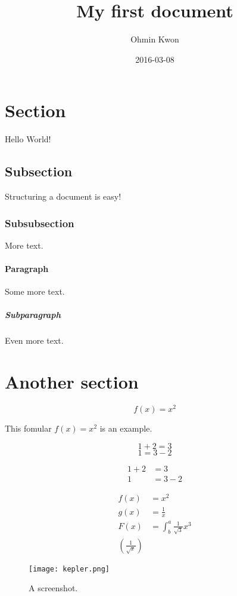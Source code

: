 \documentclass{article}
\title{My first document}
\date{2016-03-08}
\author{Ohmin Kwon}
\begin{document}
\maketitle
\tableofcontents
\newpage
{}

\section{Section}
Hello World!
\subsection{Subsection}
Structuring a document is easy!
\subsubsection{Subsubsection}
More text.
\paragraph{Paragraph}
Some more text.
\subparagraph{Subparagraph}
Even more text.
\section{Another section}

\begin{equation*}
f(x)=x^2
\end{equation*}

This fomular $f(x) =x^2$ is an example.

\begin{equation*}
1+2=3
\end{equation*}
\begin{equation*}
1=3-2
\end{equation*}

\begin{align*}
1+2&=3\\
1&=3-2
\end{align*}


\begin{align*}
f(x)&=x^2\\
g(x)&=\frac{1}{x}\\
F(x)&=\int^a_b \frac{1}{\sqrt{3}}x^3\\
\left(\frac{1}{\sqrt{x}}\right)
\end{align*}


\begin{figure}
\texttt{[image: kepler.png]}
\caption{A screenshot.}
\label{fig:screenshot1}
\end{figure}
\end{document}
